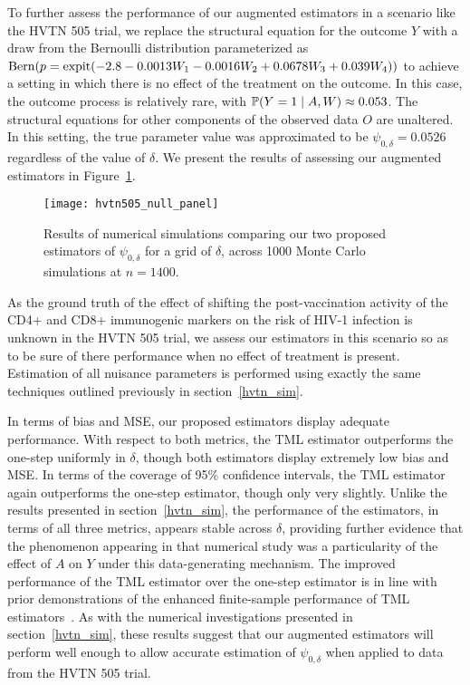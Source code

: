 To further assess the performance of our augmented estimators in a scenario like
the HVTN 505 trial, we replace the structural equation for the outcome $Y$ with
a draw from the Bernoulli distribution parameterized as $\operatorname{Bern} (p = \operatorname{expit}(-2.8
- 0.0013 W_1 - 0.0016 W_2 + 0.0678 W_3 + 0.039 W_4))$ to achieve a setting in
which there is no effect of the treatment on the outcome. In this case, the
outcome process is relatively rare, with $\mathbb{P}(Y = 1 \mid A, W) \approx
0.053$. The structural equations for other components of the observed data $O$
are unaltered. In this setting, the true parameter value was approximated to
be $\psi_{0,\delta} = 0.0526$ regardless of the value of $\delta$. We present
the results of assessing our augmented estimators in
Figure~\ref{fig:hvtn_sim_null}.
\begin{figure}[H]
  \centering
  \texttt{[image: hvtn505\_null\_panel]}
  \caption{Results of numerical simulations comparing our two proposed
     estimators of $\psi_{0,\delta}$ for a grid of $\delta$, across 1000 Monte
     Carlo simulations at $n = 1400$.}
 \label{fig:hvtn_sim_null}
\end{figure}

As the ground truth of the effect of shifting the post-vaccination activity of
the CD4+ and CD8+ immunogenic markers on the risk of HIV-1 infection is unknown
in the HVTN 505 trial, we assess our estimators in this scenario so as to be
sure of there performance when no effect of treatment is present. Estimation of
all nuisance parameters is performed using exactly the same techniques outlined
previously in section~\ref{hvtn_sim}.

In terms of bias and MSE, our proposed estimators display adequate performance.
With respect to both metrics, the TML estimator outperforms the one-step
uniformly in $\delta$, though both estimators display extremely low bias and
MSE. In terms of the coverage of 95\% confidence intervals, the TML estimator
again outperforms the one-step estimator, though only very slightly. Unlike the
results presented in section~\ref{hvtn_sim}, the performance of the estimators,
in terms of all three metrics, appears stable across $\delta$, providing further
evidence that the phenomenon appearing in that numerical study was
a particularity of the effect of $A$ on $Y$ under this data-generating
mechanism. The improved performance of the TML estimator over the one-step
estimator is in line with prior demonstrations of the enhanced finite-sample
performance of TML estimators~\citep{vdl2011targeted}. As with the numerical
investigations presented in section~\ref{hvtn_sim}, these results suggest that
our augmented estimators will perform well enough to allow accurate estimation
of $\psi_{0,\delta}$ when applied to data from the HVTN 505 trial.

